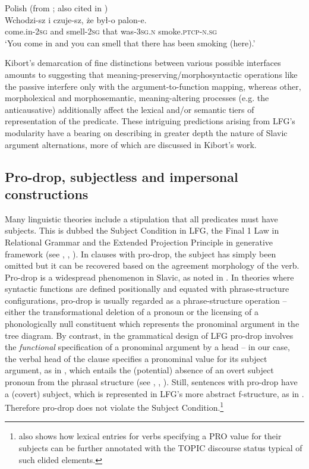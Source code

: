 \documentclass[output=paper,hidelinks]{langscibook}
\begin{document}
\ea%
    \label{ex:Slavic:26}Polish (from \citealt[ex.~55]{Kibort2006}; also cited in \citealt[344]{DLM:LFG})\\
    \gll Wchodzi-sz   i   czuje-sz,   że   był-o           palon-e.\\
        come.in-\textsc{2sg}   and   smell-\textsc{2sg}   that   was\textsc{{}-3sg.n}  smoke.\textsc{ptcp}-\textsc{n.sg}\\
    \glt `You come in and you can smell that there has been smoking (here).' 
    \z

Kibort's demarcation of fine distinctions between various possible interfaces amounts to suggesting that meaning-preserving/morphosyntactic operations like the passive interfere only with the argument-to-function mapping, whereas other, morpholexical and morphosemantic, meaning-altering processes (e.g. the anticausative) additionally affect the lexical and/or semantic tiers of representation of the predicate. These intriguing predictions arising from LFG's modularity have a bearing on describing in greater depth the nature of Slavic argument alternations, more of which are discussed in Kibort's work.

\subsection{Pro-drop, subjectless and impersonal constructions}
\label{sec:Slavic:2.6}
\largerpage

Many linguistic theories include a stipulation that all predicates must have subjects. This is dubbed the Subject Condition in LFG, the Final 1 Law in Relational Grammar and the Extended Projection Principle in  generative framework (see \citealt[311]{bresnan2001lexical}, \citealt{Kibort2001}, \citealt[21]{DLM:LFG}). In clauses with pro-drop, the subject has simply been omitted but it can be recovered based on the agreement morphology of the verb. Pro-drop is a widespread phenomenon in Slavic, as noted in . In theories where syntactic functions are defined positionally and equated with phrase-structure configurations, pro-drop is usually regarded as a phrase-structure operation -- either the transformational deletion of a pronoun or the licensing of a phonologically null constituent which represents the pronominal argument in the tree diagram. By contrast, in the grammatical design of LFG pro-drop involves the \textit{functional} specification of a pronominal argument by a head -- in our case, the verbal head of the clause specifies a pronominal value for its subject argument, as in , which entails the (potential) absence of an overt subject pronoun from the phrasal structure (see \citealt{Kibort2006}, \citealt[154 fn.~4]{BresnanEtAl2016}, ).  Still, sentences with pro-drop have a (covert) subject, which is represented in LFG's more abstract f-structure, as in . Therefore pro-drop does not violate the Subject Condition.\footnote{\citet{King1997} also shows how lexical entries for verbs specifying a PRO value for their subjects can be further annotated with the TOPIC discourse status typical of such elided elements.}
\end{document}
